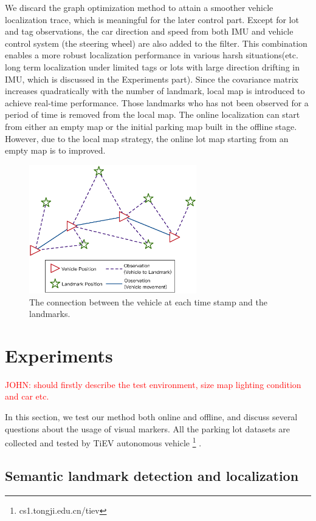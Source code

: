 \documentclass[journal]{IEEEtran}
\newcommand{\COMMENT}[1]{\textcolor{red}{#1}}
\begin{document}
We discard the graph optimization method to attain a smoother vehicle localization trace, which is meaningful for the later control part. 
Except for lot and tag observations, the car direction and speed from both IMU and vehicle control system (the steering wheel) are also added to the filter. 
This combination enables a more robust localization performance in various harsh situations(etc. long term localization under limited tags or lots with large direction drifting in IMU, which is discussed in the Experiments part). 
Since the covariance matrix increases quadratically with the number of landmark\cite{Bailey2006Simultaneous}, local map is introduced to achieve real-time performance. 
Those landmarks who has not been observed for a period of time is removed from the local map. 
The online localization can start from either an empty map or the initial parking map built in the offline stage. 
However, due to the local map strategy, the online lot map starting from an empty map is to improved.

\begin{figure}
\centering
\includegraphics[height = 2.2in]{pic/fig9_Optimize}
\caption{
The connection between the vehicle at each time stamp and the landmarks.
}\label{fig:9}
\end{figure}



\section{Experiments}
\COMMENT{JOHN: should firstly describe the test environment, size map lighting condition and car etc.}

In this section, we test our method both online and offline, and discuss several questions about the usage of visual markers. 
All the parking lot datasets are collected and tested by TiEV autonomous vehicle \footnote{cs1.tongji.edu.cn/tiev} .
\subsection{Semantic landmark detection and localization}
\end{document}
